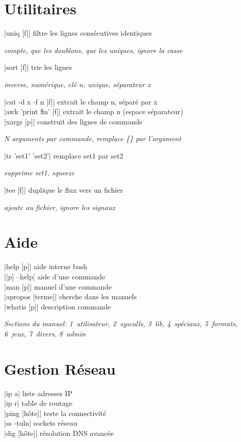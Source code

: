 \documentclass[9pt]{extarticle}
\newcommand{\lstcode}[1]{\inlinecode{\detokenize{#1}}}
\newenvironment{cmdblock}{%
  \par\setlength{\parindent}{0pt}\setlength{\parskip}{0pt}%
  \RaggedRight%
}{\par}
\newlength{\cmdoptindent}
\newcommand{\cmdopt}[1]{%
  \hspace*{\cmdoptindent}%
  \begin{minipage}[t]{\dimexpr\linewidth-\cmdoptindent\relax}
    \RaggedRight \itshape #1%
  \end{minipage}\par
}
\begin{document}
\begin{multicols}{4}
\section*{Utilitaires}
\begin{cmdblock}
\code|uniq [f]| \quad filtre les lignes consécutives identiques \\
\cmdopt{\lstcode{-c} compte, \lstcode{-d} que les doublons,
        \lstcode{-u} que les uniques, \lstcode{-i} ignore la casse}
\code|sort [f]| \quad trie les lignes \\
\cmdopt{\lstcode{-r} inverse, \lstcode{-n} numérique,
        \lstcode{-k n} clé n, \lstcode{-u} unique,
        \lstcode{-t x} séparateur x}
\code|cut -d x -f n [f]| \quad extrait le champ n, séparé par x \\
\code|awk '{print \$n}' [f]| \quad extrait le champ n (espace séparateur) \\
\code|xargs [p]| \quad construit des lignes de commande \\
\cmdopt{\lstcode{-n N} N arguments par commande,
        \lstcode{-I \{\}} remplace \{\} par l'argument}
\code|tr 'set1' 'set2'| \quad remplace set1 par set2 \\
\cmdopt{\lstcode{-d} supprime set1, \lstcode{-s} squeeze}
\code|tee [f]| \quad duplique le flux vers un fichier \\
\cmdopt{\lstcode{-a} ajoute au fichier, \lstcode{-i} ignore les signaux}
\end{cmdblock}

\section*{Aide}
\begin{cmdblock}
\code|help [p]| \quad aide interne bash \\
\code|[p] --help| \quad aide d'une commande \\
\code|man [p]| \quad manuel d'une commande \\
\code|apropos [terme]| \quad cherche dans les manuels \\
\code|whatis [p]| \quad description commande \\
\end{cmdblock}

\emph{Sections du manuel: 1~utilisateur, 2~syscalls, 3~lib, 4~spéciaux, 5~formats, 6~jeux, 7~divers, 8~admin}

\section*{Gestion Réseau}
\begin{cmdblock}
\code|ip a| \quad liste adresses IP \\
\code|ip r| \quad table de routage \\
\code|ping [hôte]| \quad teste la connectivité \\
\code|ss -tuln| \quad sockets réseau \\
\code|dig [hôte]| \quad résolution DNS avancée \\
\end{cmdblock}


\end{multicols}
\end{document}
